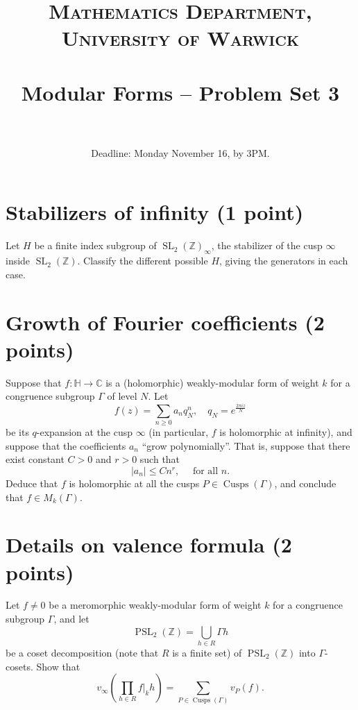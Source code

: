 \documentclass[paper=a4, fontsize=11pt]{scrartcl} %
\title{	
\normalfont \normalsize 
\textsc{Mathematics Department, University of Warwick} \\ [20pt] %
\horrule{0.5pt} \\[0.4cm] %
\huge Modular Forms -- Problem Set 3 \\ %
\horrule{2pt} \\ %
}
\date{Deadline: Monday November 16, by 3PM.}
\numberwithin{equation}{section} %
\numberwithin{figure}{section} %
\numberwithin{table}{section} %
\newcommand{\bbC}{\mathbb{C}}
\newcommand{\bbZ}{\mathbb{Z}}
\newcommand{\bbH}{\mathbb{H}}
\newcommand{\CC}{\bbC}
\newcommand{\HH}{\bbH}
\newcommand{\ZZ}{\bbZ}
\DeclareMathOperator{\SL}{SL}
\DeclareMathOperator{\PSL}{PSL}
\begin{document}
\maketitle %

\section{Stabilizers of infinity (1 point)}
Let $H$ be a finite index subgroup of $\SL_2(\ZZ)_\infty$, the stabilizer of the cusp $\infty$ inside $\SL_2(\ZZ)$. Classify the different possible $H$, giving the generators in each case.

\section{Growth of Fourier coefficients (2 points)}
Suppose that $f\colon \HH\to \CC$ is a (holomorphic) weakly-modular form of weight $k$ for a congruence subgroup $\Gamma$ of level $N$. Let
\[
f(z)=\sum_{n\geq 0} a_n q_N^n,\quad q_N=e^{\frac{2\pi i z}{N}}
\]
be its $q$-expansion at the cusp $\infty$ (in particular, $f$ is holomorphic at infinity), and suppose that the coefficients $a_n$ ``grow polynomially''. That is, suppose that there exist constant $C>0$ and $r>0$ such that
\[
|a_n|\leq Cn^r, \quad\text{ for all $n$.}
\]
Deduce that $f$ is holomorphic at all the cusps $P\in\operatorname{Cusps}(\Gamma)$, and conclude that $f\in M_k(\Gamma)$.

\section{Details on valence formula (2 points)}
Let $f\neq 0$ be a meromorphic weakly-modular form of weight $k$ for a congruence subgroup $\Gamma$, and let
\[
\PSL_2(\ZZ)=\bigcup_{h\in R} \Gamma h
\]
be a coset decomposition (note that $R$ is a finite set) of $\PSL_2(\ZZ)$ into $\Gamma$-cosets. Show that
\[
v_\infty\left(\prod_{h\in R} f|_k h\right) = \sum_{P\in\operatorname{Cusps}(\Gamma)} v_P(f).
\]
\end{document}

